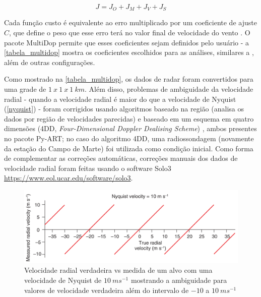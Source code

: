 \begin{equation}
	J=J_O+J_M+J_V+J_S
\end{equation}

Cada função custo é equivalente ao erro multiplicado por um coeficiente de ajuste $C$, que define o peso que esse erro terá no valor final de velocidade do vento \cite{Potvin2012b}. O pacote MultiDop permite que esses coeficientes sejam definidos pelo usuário - a \autoref{tabela_multidop} mostra os coeficientes escolhidos para as análises, similares a , além de outras configurações.



Como mostrado na \autoref{tabela_multidop}, os dados de radar foram convertidos para uma grade de $1\:x\:1\:x\:1\:km$. Além disso, problemas de ambiguidade da velocidade radial - quando a velocidade radial é maior do que a velocidade de Nyquist (\autoref{nyquist}) - foram corrigidos usando algoritmos baseado na região (analisa os dados por região de velocidades parecidas) e baseado em um esquema em quatro dimensões (4DD, \textit{Four-Dimensional Doppler Dealising Scheme}) \cite{James2001}, ambos presentes no pacote Py-ART; no caso do algoritmo 4DD, uma radiossondagem (novamente da estação do Campo de Marte) foi utilizada como condição inicial. Como forma de complementar as correções automáticas, correções manuais dos dados de velocidade radial foram feitas usando o software Solo3 \url{https://www.eol.ucar.edu/software/solo3}.

\begin{figure}[htb]
	\begin{center}
		\caption{Velocidade radial verdadeira vs medida de um alvo com uma velocidade de Nyquist de $10\:ms^{-1}$ mostrando a ambiguidade para valores de velocidade verdadeira além do intervalo de $-10$ a $10\:ms^{-1}$} 
		\label{nyquist}
		\includegraphics[width=\columnwidth]{figs/nyquist_rauber.png}
	\end{center}
\end{figure}

